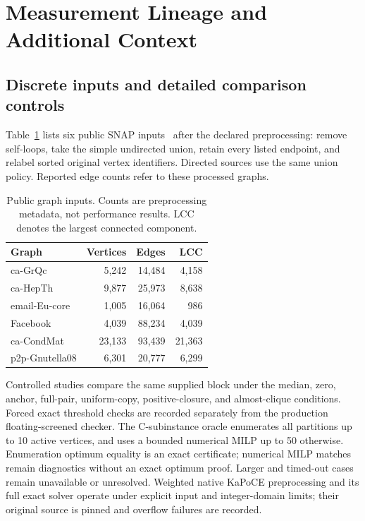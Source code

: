\documentclass[sigconf,anonymous,review]{acmart}
\newcommand{\1}{\mathbf{1}}
\begin{document}
\section{Measurement Lineage and Additional Context}\label{app:measurement-protocol}
\subsection{Discrete inputs and detailed comparison controls}\label{app:discrete-inputs}
Table~\ref{tab:data} lists six public SNAP inputs~\cite{leskovec2014snap,leskovec2007graph,yin2017local,mcauley2012learning,ripeanu2002mapping} after the declared preprocessing:
remove self-loops, take the simple undirected union, retain every listed endpoint,
and relabel sorted original vertex identifiers. Directed sources use the same
union policy. Reported edge counts refer to these processed graphs.
\begin{table}[t]
\caption{Public graph inputs. Counts are preprocessing metadata, not performance
results. LCC denotes the largest connected component.}\label{tab:data}
\centering
\begin{tabular}{lrrr}\toprule
Graph & Vertices & Edges & LCC\\\midrule
ca-GrQc &5,242&14,484&4,158\\
ca-HepTh &9,877&25,973&8,638\\
email-Eu-core &1,005&16,064&986\\
Facebook &4,039&88,234&4,039\\
ca-CondMat &23,133&93,439&21,363\\
p2p-Gnutella08 &6,301&20,777&6,299\\\bottomrule
\end{tabular}
\end{table}

Controlled studies compare the same supplied block under the median, zero,
anchor, full-pair, uniform-copy, positive-closure, and almost-clique conditions.
Forced exact threshold checks are recorded separately from the production
floating-screened checker. The C-subinstance oracle enumerates all partitions
up to 10 active vertices, and uses a bounded numerical MILP up to 50 otherwise.
Enumeration optimum equality is an exact certificate; numerical MILP matches
remain diagnostics without an exact optimum proof. Larger and timed-out cases
remain unavailable or unresolved. Weighted native KaPoCE preprocessing and its
full exact solver operate under explicit input and integer-domain limits;
their original source is pinned and overflow failures are recorded.
\end{document}
